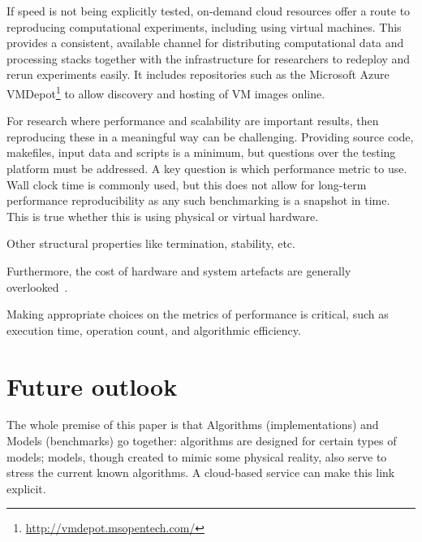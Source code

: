 \documentclass[conference]{IEEEtran}
\begin{document}
If speed is not being explicitly tested, on-demand cloud resources
offer a route to reproducing computational experiments, including
using virtual machines. This provides a consistent, available channel
for distributing computational data and processing stacks together
with the infrastructure for researchers to redeploy and rerun
experiments easily. It includes repositories such as the Microsoft
Azure VMDepot\footnote{\url{http://vmdepot.msopentech.com/}} to allow
discovery and hosting of VM images online.

For research  where performance and scalability are important results, then 
reproducing these in a meaningful way can be challenging. Providing source
code, makefiles, input data and scripts is a minimum, but questions over the
testing platform must be addressed. A key question is which performance 
metric to use. Wall clock time is commonly used, but this does not allow for 
long-term performance reproducibility as any such benchmarking is a 
snapshot in time. This is true whether this is using physical 
or virtual hardware. 


Other structural properties like termination, stability, etc. 

Furthermore, the cost of hardware and system
artefacts are generally overlooked~\cite{brain+devos:2009}.

Making appropriate choices on the metrics of 
performance is critical, such as execution time, operation count, and 
algorithmic efficiency.



\section{Future outlook}





The whole premise of this paper is that Algorithms (implementations)
and Models (benchmarks) go together: algorithms are designed for
certain types of models; models, though created to mimic some physical
reality, also serve to stress the current known algorithms. A
cloud-based service can make this link explicit.
\end{document}
